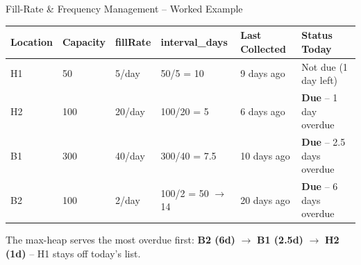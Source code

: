 \documentclass[aspectratio=169,11pt]{beamer}
\begin{document}
\begin{frame}[fragile]{Fill-Rate \& Frequency Management -- Worked Example}
\scriptsize
\begin{center}
\renewcommand{\arraystretch}{1.25}
\begin{tabularx}{\textwidth}{@{}>{\ttfamily}p{1.1cm}p{1.15cm}p{1.2cm}p{1.7cm}p{2.0cm}X@{}}
\toprule
\normalfont Location & \normalfont Capacity & \normalfont fillRate & \normalfont interval\_days & \normalfont Last Collected & \normalfont Status Today\\
\midrule
H1 & 50 & 5/day & 50/5 = 10 & 9 days ago & Not due (1 day left)\\
H2 & 100 & 20/day & 100/20 = 5 & 6 days ago & \textbf{Due} -- 1 day overdue\\
B1 & 300 & 40/day & 300/40 = 7.5 & 10 days ago & \textbf{Due} -- 2.5 days overdue\\
B2 & 100 & 2/day & 100/2 = 50 $\to$ 14 & 20 days ago & \textbf{Due} -- 6 days overdue\\
\bottomrule
\end{tabularx}
\end{center}
\vspace{2mm}
\begin{center}
\colorbox{GEULightBlue}{\parbox{.9\textwidth}{\centering
The max-heap serves the most overdue first: \textbf{B2 (6d)} $\to$ \textbf{B1 (2.5d)} $\to$ \textbf{H2 (1d)} -- H1 stays off today's list.}}
\end{center}
\end{frame}
\end{document}
